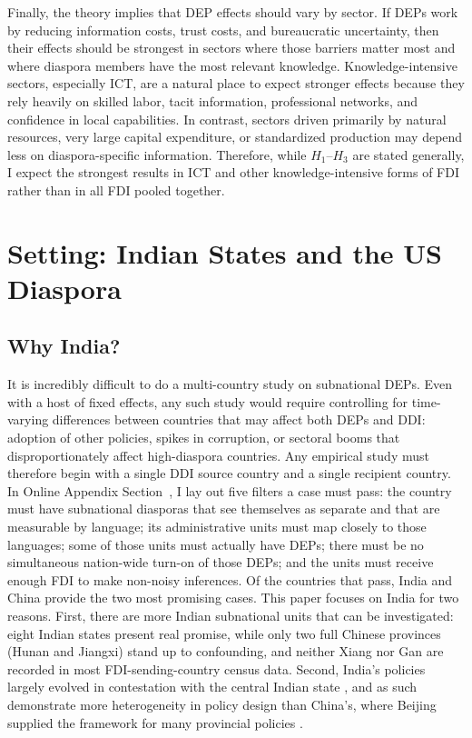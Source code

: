\documentclass[12pt]{article}
\begin{document}
Finally, the theory implies that DEP effects should vary by sector. If DEPs work by reducing information costs, trust costs, and bureaucratic uncertainty, then their effects should be strongest in sectors where those barriers matter most and where diaspora members have the most relevant knowledge. Knowledge-intensive sectors, especially ICT, are a natural place to expect stronger effects because they rely heavily on skilled labor, tacit information, professional networks, and confidence in local capabilities. In contrast, sectors driven primarily by natural resources, very large capital expenditure, or standardized production may depend less on diaspora-specific information. Therefore, while $H_1$--$H_3$ are stated generally, I expect the strongest results in ICT and other knowledge-intensive forms of FDI rather than in all FDI pooled together.

\section{Setting: Indian States and the US Diaspora} \label{sec:setting}

\subsection{Why India?}

It is incredibly difficult to do a multi-country study on subnational DEPs. Even with a host of fixed effects, any such study would require controlling for time-varying differences between countries that may affect both DEPs and DDI: adoption of other policies, spikes in corruption, or sectoral booms that disproportionately affect high-diaspora countries. Any empirical study must therefore begin with a single DDI source country and a single recipient country. In Online Appendix Section~, I lay out five filters a case must pass: the country must have subnational diasporas that see themselves as separate and that are measurable by language; its administrative units must map closely to those languages; some of those units must actually have DEPs; there must be no simultaneous nation-wide turn-on of those DEPs; and the units must receive enough FDI to make non-noisy inferences. Of the countries that pass, India and China provide the two most promising cases. This paper focuses on India for two reasons. First, there are more Indian subnational units that can be investigated: eight Indian states present real promise, while only two full Chinese provinces (Hunan and Jiangxi) stand up to confounding, and neither Xiang nor Gan are recorded in most FDI-sending-country census data. Second, India's policies largely evolved in contestation with the central Indian state \citep{sharma_partisan_2020}, and as such demonstrate more heterogeneity in policy design than China's, where Beijing supplied the framework for many provincial policies \citep{liu_chinas_2016}.
\end{document}
